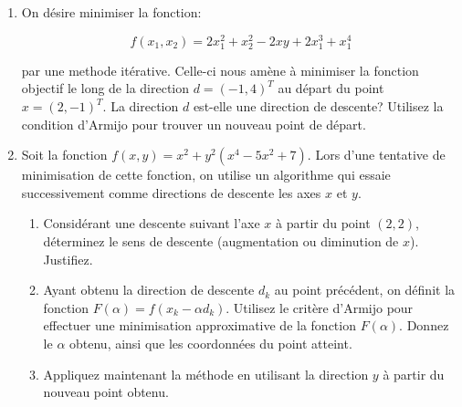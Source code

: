 \begin{enumerate}
  \item On d\'esire minimiser la fonction:

    $$
    f(x_1, x_2)=2x_1^2 + x_2^2 - 2xy + 2x_1^3 + x_1^4
    $$

    par une methode it\'erative. Celle-ci nous am\`ene \`a minimiser
    la fonction objectif le long de la direction $d = (-1, 4)^T$ au
    d\'epart du point $x=(2,-1)^T$. La direction $d$ est-elle une
    direction de descente? Utilisez la condition d'Armijo pour trouver
    un nouveau point de d\'epart.


%


    \begin{solution}
    \end{solution}

  \item Soit la fonction $f(x,y)=x^2+y^2(x^4-5x^2+7)$. Lors d'une
    tentative de minimisation de cette fonction, on utilise un
    algorithme qui essaie successivement comme directions de descente
    les axes $x$ et $y$.
    \begin{enumerate}
      \item Considérant une descente suivant l'axe $x$ à partir du point
        $(2,2)$, déterminez le sens de descente (augmentation ou
        diminution de $x$). Justifiez.
      \item Ayant obtenu la direction de
        descente $d_k$ au point précédent, on définit la fonction
        $F(\alpha)=f(x_k-\alpha d_k)$. Utilisez le critère d'Armijo pour
        effectuer une minimisation approximative de la fonction
        $F(\alpha)$. Donnez le $\alpha$ obtenu, ainsi que les coordonnées
        du point atteint.
      \item Appliquez maintenant la méthode en utilisant
        la direction $y$ à partir du nouveau point obtenu.
    \end{enumerate}







\end{enumerate}
